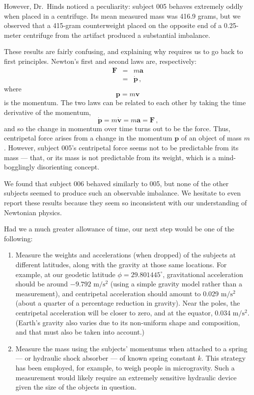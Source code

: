 \documentclass[10pt,twoside,openany]{article}
\theoremstyle{definition}
\begin{document}
However, Dr.~Hinds noticed a peculiarity: subject 005 behaves extremely oddly when placed in a centrifuge.
Its mean measured mass was 416.9 grams, but we observed that a 415-gram counterweight placed on the opposite end of a 0.25-meter centrifuge from the artifact produced a substantial imbalance.

These results are fairly confusing, and explaining why requires us to go back to first principles.
Newton's first and second laws are, respectively:
%
\begin{eqnarray}
\mathbf{F} &=& m \mathbf{a} \\
 &=& \dot{\mathbf{p}}\,\textrm{,}
\end{eqnarray}
%
where
%
\begin{equation}
\mathbf{p} = m \mathbf{v}
\end{equation}
%
is the momentum.
%
The two laws can be related to each other by taking the time derivative of the momentum,
%
\begin{equation}
\dot{\mathbf{p}} = m \dot{\mathbf{v}} = m \mathbf{a} = \mathbf{F}\,\textrm{,}
\end{equation}
%
and so the change in momentum over time turns out to be the force.
Thus, centripetal force arises from a change in the momentum $\mathbf{p}$ of an object of mass $m$.
However, subject 005's centripetal force seems not to be predictable from its mass --- that, or its mass is not predictable from its weight, which is a mind-bogglingly disorienting concept.

We found that subject 006 behaved similarly to 005, but none of the other subjects seemed to produce such an observable imbalance.
We hesitate to even report these results because they seem so inconsistent with our understanding of Newtonian physics.

Had we a much greater allowance of time, our next step would be one of the following:
\begin{enumerate}
\item Measure the weights and accelerations (when dropped) of the subjects at different latitudes, along with the gravity at those same locations. For example, at our geodetic latitude $\phi=29.801445^\circ$, gravitational acceleration should be around $-9.792\textrm{ m}/\textrm{s}^2$ (using a simple gravity model rather than a measurement), and centripetal acceleration should amount to 0.029 $\textrm{m}/\textrm{s}^2$ (about a quarter of a percentage reduction in gravity). Near the poles, the centripetal acceleration will be closer to zero, and at the equator, 0.034 $\textrm{m}/\textrm{s}^2$. (Earth's gravity also varies due to its non-uniform shape and composition, and that must also be taken into account.)
\item Measure the mass using the subjects' momentums when attached to a spring --- or hydraulic shock absorber --- of known spring constant $k$. This strategy has been employed, for example, to weigh people in microgravity. Such a measurement would likely require an extremely sensitive hydraulic device given the size of the objects in question.
\end{enumerate}
\end{document}
